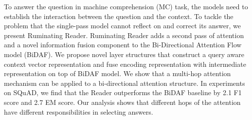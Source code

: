 To answer the question in machine comprehension (MC) task, the models need to establish the interaction between the question and the context. To tackle the problem that the single-pass model cannot reflect on and correct its answer, we present Ruminating Reader. Ruminating Reader adds a second pass of attention and a novel information fusion component to the Bi-Directional Attention Flow model (BiDAF). We propose novel layer structures that construct a query aware context vector representation and fuse encoding representation with intermediate representation on top of BiDAF model. We show that a multi-hop attention mechanism can be applied to a bi-directional attention structure. In experiments on SQuAD, we find that the Reader outperforms the BiDAF baseline by 2.1 F1 score and 2.7 EM score. Our analysis shows that different hops of the attention have different responsibilities in selecting answers.
